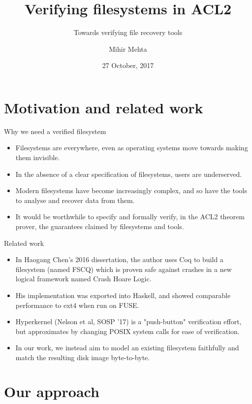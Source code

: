 \documentclass{beamer}
\title{Verifying filesystems in ACL2}
\subtitle{Towards verifying file recovery tools}
\author{Mihir Mehta}
\institute{
  Department of Computer Science\\
  University of Texas at Austin\\[1ex]
  \texttt{mihir@cs.utexas.edu}
}
\date{27 October, 2017}
\begin{document}
\begin{frame}[plain]
  \titlepage
\end{frame}


\section{Motivation and related work}

\begin{frame}{Why we need a verified filesystem}
  \begin{itemize}
  \item Filesystems are everywhere, even as operating systems move
    towards making them invisible.
  \item In the absence of a clear specification of filesystems, users
    are underserved.
  \item Modern filesystems have become increasingly complex, and so
    have the tools to analyse and recover data from them.
  \item It would be worthwhile to specify and formally verify, in the
    ACL2 theorem prover, the guarantees claimed by filesystems and tools.
  \end{itemize}
\end{frame}

\begin{frame}{Related work}
  \begin{itemize}
  \item In Haogang Chen's 2016 dissertation, the author uses Coq to
    build a filesystem (named FSCQ) which is proven safe against
    crashes in a new logical framework named Crash Hoare Logic.
  \item His implementation was exported into Haskell, and showed
    comparable performance to ext4 when run on FUSE.
  \item Hyperkernel (Nelson et al, SOSP '17) is a "push-button"
    verification effort, but approximates by changing POSIX system
    calls for ease of verification.
  \item In our work, we instead aim to model an existing filesystem
    faithfully and match the resulting disk image byte-to-byte.
  \end{itemize}
\end{frame}

\section{Our approach}
\end{document}
